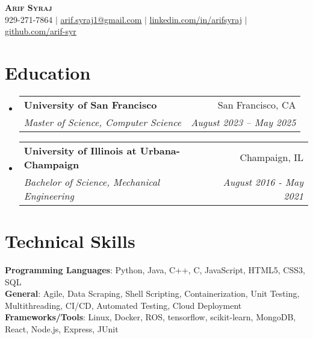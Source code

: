 \documentclass[letterpaper,11pt]{article}
\makeatletter
\newcommand{\resumeSubheading}[4]{
  \vspace{-3pt}\item
    \begin{tabular*}{0.97\textwidth}[t]{l@{\extracolsep{\fill}}r}
      \textbf{#1} & #2 \\
      \textit{\small#3} & \textit{\small #4} \\
    \end{tabular*}\vspace{-7pt}
}
\newcommand{\resumeSubHeadingListStart}
{\begin{itemize}[leftmargin=0.05in, label={}]}
\newcommand{\resumeSubHeadingListEnd}{\end{itemize}}
\makeatother
\begin{document}

\begin{center}
  \textbf{\Huge \scshape Arif Syraj} \\ \vspace{1pt}
  \small 929-271-7864 $|$ \href{mailto:arif.syraj1@gmail.com}{\underline{arif.syraj1@gmail.com}} $|$
  \href{https://linkedin.com/in/arifsyraj}{\underline{linkedin.com/in/arifsyraj}} $|$
  \href{https://github.com/arif-syr}{\underline{github.com/arif-syr}}
\end{center}


\section{Education}
\resumeSubHeadingListStart
\resumeSubheading
{University of San Francisco}{San Francisco, CA}
{Master of Science, Computer Science}{August 2023 -- May 2025}

\resumeSubheading
{University of Illinois at Urbana-Champaign}{Champaign, IL}
{Bachelor of Science, Mechanical Engineering}{August 2016 - May 2021}

\resumeSubHeadingListEnd

\section{Technical Skills}
\begin{itemize}[leftmargin=0.15in, label={}]
  \small{\item{
        \textbf{Programming Languages}{: Python, Java, C++, C, JavaScript, HTML5, CSS3, SQL} \\
        \textbf{General}{: Agile, Data Scraping, Shell Scripting, Containerization, Unit Testing, Multithreading, CI/CD, Automated Testing, Cloud Deployment} \\
        \textbf{Frameworks/Tools}{: Linux, Docker, ROS, tensorflow, scikit-learn, MongoDB, React, Node.js, Express, JUnit}
        }}
\end{itemize}
\end{document}
